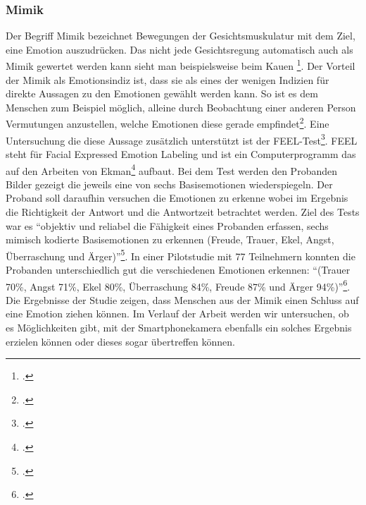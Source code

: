 \subsubsection{Mimik}
Der Begriff Mimik bezeichnet Bewegungen der Gesichtsmuskulatur mit dem Ziel, eine Emotion auszudrücken. Das nicht jede Gesichtsregung automatisch auch als Mimik gewertet werden kann sieht man beispielsweise beim Kauen \footcite[Vgl. ][Mimik: Eine kurze Definition]{Kar18}.\newline
Der Vorteil der Mimik als Emotionsindiz ist, dass sie als eines der wenigen Indizien für direkte Aussagen zu den Emotionen gewählt werden kann. So ist es dem Menschen zum Beispiel möglich, alleine durch Beobachtung einer anderen Person Vermutungen anzustellen, welche Emotionen diese gerade empfindet\footcite[Vgl. ][Die sieben Grundemotionen, Absatz 1]{Kar18}. Eine Untersuchung die diese Aussage zusätzlich unterstützt ist der FEEL-Test\footcite[][]{Kes02}. FEEL steht für Facial Expressed Emotion Labeling und ist ein Computerprogramm das auf den Arbeiten von Ekman\footcite{Ekm92} aufbaut. Bei dem Test werden den Probanden Bilder gezeigt die jeweils eine von sechs Basisemotionen wiederspiegeln. Der Proband soll daraufhin versuchen die Emotionen zu erkenne wobei im Ergebnis die Richtigkeit der Antwort und die Antwortzeit betrachtet werden. Ziel des Tests war es ``objektiv
und reliabel die Fähigkeit eines Probanden erfassen, sechs mimisch kodierte Basisemotionen zu erkennen (Freude, Trauer, Ekel, Angst, Überraschung und Ärger)''\footcite[siehe. ][S.5 Z.11ff]{Kes02}. In einer Pilotstudie mit 77 Teilnehmern konnten die Probanden unterschiedlich gut die verschiedenen Emotionen erkennen: ``(Trauer 
70\%, Angst 71\%, Ekel 80\%, Überraschung 84\%, Freude 87\% und Ärger 94\%)''\footcite[siehe. ][S.9 Z.9f]{Kes02}.\newline
Die Ergebnisse der Studie zeigen, dass Menschen aus der Mimik einen Schluss auf eine Emotion ziehen können. Im Verlauf der Arbeit werden wir untersuchen, ob es Möglichkeiten gibt, mit der Smartphonekamera ebenfalls ein solches Ergebnis erzielen können oder dieses sogar übertreffen können. 

